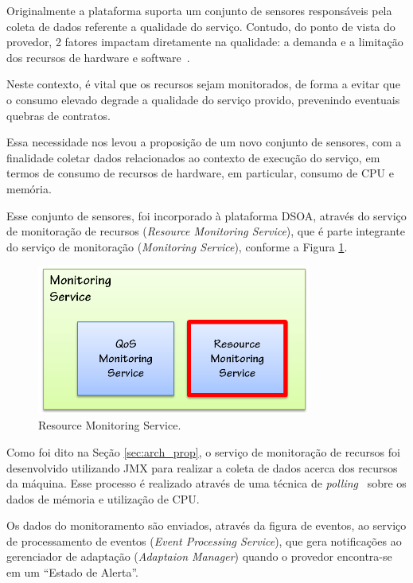 Originalmente a plataforma suporta um conjunto de sensores responsáveis pela coleta de dados referente a qualidade do serviço. Contudo, do ponto de vista do provedor, 2 fatores impactam diretamente na qualidade: a demanda e a limitação dos recursos de hardware e software~\cite{ye2011models}. 

Neste contexto, é vital que os recursos sejam monitorados, de forma a evitar que o consumo elevado degrade a qualidade do serviço provido, prevenindo eventuais quebras de contratos.

Essa necessidade nos levou a proposição de um novo conjunto de sensores, com a finalidade coletar dados relacionados ao contexto de execução do serviço, em termos de consumo de recursos de hardware, em particular, consumo de CPU e memória. 

Esse conjunto de sensores, foi incorporado à plataforma DSOA, através do serviço de monitoração de recursos (\textit{Resource Monitoring Service}), que é parte integrante do serviço de monitoração (\textit{Monitoring Service}), conforme a Figura \ref{fig:resc_module}.

\begin{figure}[htp]
\centering
\includegraphics[width=9cm]{chapters/chapter4/monitoring-service.png}
\caption[Resource Monitoring Service]{Resource Monitoring Service.}
\label{fig:resc_module}
\end{figure}

Como foi dito na Seção \ref{sec:arch_prop}, o serviço de monitoração de recursos foi desenvolvido utilizando JMX para realizar a coleta de dados acerca dos recursos da máquina. Esse processo é realizado através de uma técnica de \textit{polling}~\cite{patterson2005organizacao} sobre os dados de mémoria e utilização de CPU.

Os dados do monitoramento são enviados, através da figura de eventos, ao serviço de processamento de eventos (\textit{Event Processing Service}), que gera notificações ao gerenciador de adaptação (\textit{Adaptaion Manager}) quando o provedor encontra-se em um ``Estado de Alerta''.

